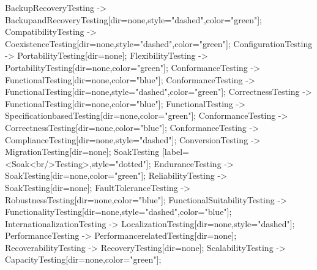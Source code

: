 \documentclass{article}
\begin{document}
{BackupRecoveryTesting -> BackupandRecoveryTesting[dir=none,style="dashed",color="green"];
CompatibilityTesting -> CoexistenceTesting[dir=none,style="dashed",color="green"];
ConfigurationTesting -> PortabilityTesting[dir=none];
FlexibilityTesting -> PortabilityTesting[dir=none,color="green"];
ConformanceTesting -> FunctionalTesting[dir=none,color="blue"];
ConformanceTesting -> FunctionalTesting[dir=none,style="dashed",color="green"];
CorrectnessTesting -> FunctionalTesting[dir=none,color="blue"];
FunctionalTesting -> SpecificationbasedTesting[dir=none,color="green"];
ConformanceTesting -> CorrectnessTesting[dir=none,color="blue"];
ConformanceTesting -> ComplianceTesting[dir=none,style="dashed"];
ConversionTesting -> MigrationTesting[dir=none];
SoakTesting [label=<Soak<br/>Testing>,style="dotted"];
EnduranceTesting -> SoakTesting[dir=none,color="green"];
ReliabilityTesting -> SoakTesting[dir=none];
FaultToleranceTesting -> RobustnessTesting[dir=none,color="blue"];
FunctionalSuitabilityTesting -> FunctionalityTesting[dir=none,style="dashed",color="blue"];
InternationalizationTesting -> LocalizationTesting[dir=none,style="dashed"];
PerformanceTesting -> PerformancerelatedTesting[dir=none];
RecoverabilityTesting -> RecoveryTesting[dir=none];
ScalabilityTesting -> CapacityTesting[dir=none,color="green"];

}
\end{document}
